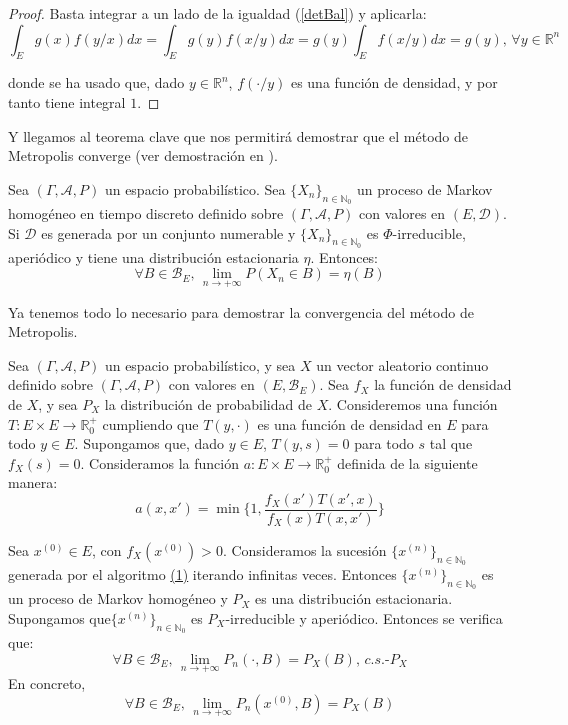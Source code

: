 \begin{proof}
Basta integrar a un lado de la igualdad (\ref{detBal}) y aplicarla:
$$\int_E g(x)f(y/x)dx = \int_E g(y)f(x/y)dx = g(y)\int_E f(x/y)dx = g(y) \text{, }\forall y\in\mathds{R}^n$$

donde se ha usado que, dado $y\in\mathds{R}^n$, $f(\cdot/y)$ es una función de densidad, y por tanto tiene integral $1$.

\end{proof}

Y llegamos al teorema clave que nos permitirá demostrar que el método de Metropolis converge (ver demostración en \cite{Roberts2004}).

\begin{teorema}\label{teoMetro}
Sea $(\Gamma , \mathcal{A}, P)$ un espacio probabilístico. Sea $\{X_n\}_{n\in \mathds{N}_0}$ un proceso de Markov homogéneo en tiempo discreto definido sobre $(\Gamma, \mathcal{A}, P)$ con valores en $(E,\mathcal{D})$. Si $\mathcal{D}$ es generada por un conjunto numerable y $\{X_n\}_{n\in \mathds{N}_0}$ es $\Phi$-irreducible, aperiódico y tiene una distribución estacionaria $\eta$. Entonces:
$$\forall B\in\mathscr{B}_E \text{, } \lim_{n\to +\infty}P(X_n\in B) = \eta(B)$$
\end{teorema}


Ya tenemos todo lo necesario para demostrar la convergencia del método de Metropolis.

\begin{teorema}
Sea $(\Gamma,\mathcal{A}, P)$ un espacio probabilístico, y sea $X$ un vector aleatorio continuo definido sobre $(\Gamma,\mathcal{A}, P)$ con valores en $(E,\mathscr{B}_E)$. Sea $f_X$ la función de densidad de $X$, y sea $P_X$ la distribución de probabilidad de $X$. Consideremos una función $T:E\times E\rightarrow \mathds{R}_0^+$ cumpliendo que $T(y,\cdot)$ es una función de densidad en $E$ para todo $y\in E$. Supongamos que, dado $y\in E$, $T(y,s)=0$ para todo $s$ tal que $f_X(s)=0$. Consideramos la función $a:E\times E\rightarrow \mathds{R}_0^+$ definida de la siguiente manera:
$$a(x,x')=\min\{1,\frac{f_X(x')T(x',x)}{f_X(x)T(x,x')}\} $$

Sea $x^{(0)}\in E$, con $f_X(x^{(0)})>0$. Consideramos la sucesión $\{x^{(n)}\}_{n\in\mathds{N}_0}$ generada por el algoritmo \hyperref[metMetro]{(1)} iterando infinitas veces. Entonces $\{x^{(n)}\}_{n\in\mathds{N}_0}$ es un proceso de Markov homogéneo y $P_X$ es una distribución estacionaria. Supongamos que$\{x^{(n)}\}_{n\in\mathds{N}_0}$ es $P_X$-irreducible y aperiódico. Entonces se verifica que:
$$\forall B\in\mathscr{B}_E \text{, } \lim_{n\to +\infty}P_n(\cdot,B) = P_X(B)\text{, } c.s.\text{-}P_X$$
En concreto,
$$\forall B\in\mathscr{B}_E \text{, } \lim_{n\to +\infty}P_n(x^{(0)},B) = P_X(B)$$
\end{teorema}

